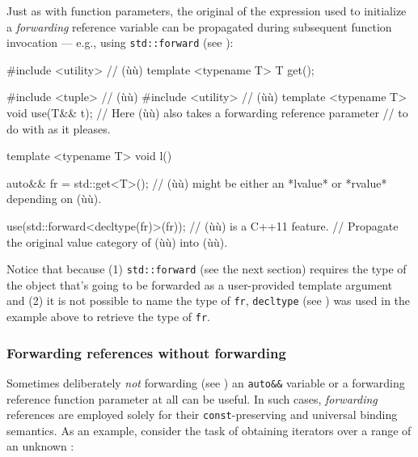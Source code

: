 \noindent Just as with function parameters, the original 
of the expression used to initialize a \emph{forwarding} reference
variable can be propagated during subsequent function invocation ---
e.g., using \lstinline!std::forward! (see ):

\begin{emcppshiddenlisting}[emcppsbatch=e5]
#include <utility>  // (ù{}ù)
template <typename T>
T get();
\end{emcppshiddenlisting}
\begin{emcppslisting}[emcppsbatch=e5]
#include <tuple>   // (ù{}ù)
#include <utility> // (ù{}ù)
template <typename T>
void use(T&& t); // Here (ù{}ù) also takes a forwarding reference parameter
                 // to do with as it pleases.

template <typename T>
void l()
{
    auto&& fr = std::get<T>();
        // (ù{}ù) might be either an *lvalue* or *rvalue* depending on (ù{}ù).

    use(std::forward<decltype(fr)>(fr));  // (ù{}ù) is a C++11 feature.
        // Propagate the original value category of (ù{}ù) into (ù{}ù).
}
\end{emcppslisting}

\noindent Notice that because (1) \lstinline!std::forward! (see the next section) requires the
type of the object that's going to be forwarded as a user-provided
template argument and (2) it is not possible to name the type of
\lstinline!fr!, \lstinline!decltype! (see ) 
was used in the example above
to retrieve the type of \lstinline!fr!.

\subsubsection[Forwarding references without forwarding]{Forwarding references without forwarding}\label{forwarding-references-without-forwarding}

Sometimes deliberately \emph{not} forwarding (see ) 
an \lstinline!auto&&! variable or
a forwarding reference function parameter at all can be useful. In such cases, \emph{forwarding} references are employed solely for their \lstinline!const!-preserving
and universal binding semantics. As an example, consider the task of
obtaining iterators over a range of an unknown :

